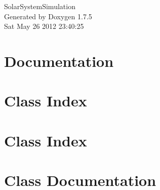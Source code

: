 \documentclass[a4paper]{book}
\begin{document}
\begin{titlepage}
\vspace*{7cm}
\begin{center}
{\Large \-Solar\-System\-Simulation }\\
\vspace*{1cm}
{\large \-Generated by Doxygen 1.7.5}\\
\vspace*{0.5cm}
{\small Sat May 26 2012 23:40:25}\\
\end{center}
\end{titlepage}
\clearemptydoublepage
{}
\tableofcontents
\clearemptydoublepage
{}
\chapter{\-Documentation}
\label{index}
\chapter{\-Class \-Index}

\chapter{\-Class \-Index}

\chapter{\-Class \-Documentation}






































\printindex
\end{document}
